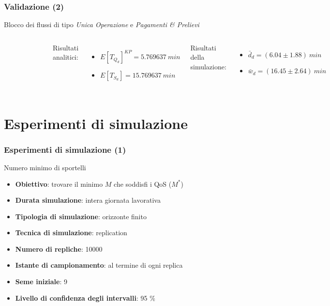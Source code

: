 \documentclass[
	usepdftitle=false,
	xcolor={table, dvipsnames},
	hyperref={
		pdftitle={Studio delle prestazioni di un Ufficio Postale ispirato a Poste Italiane},
    	pdfauthor={A. Chillotti, C. Cuffaro e S. Tiberi}
    }
]{beamer}
\newcommand{\uo}{\textsl{Unica Operazione}}
\newcommand{\pp}{\textsl{Pagamenti \& Prelievi}}
\begin{document}
\begin{frame}
\frametitle{Validazione (2)}
Blocco dei flussi di tipo \uo{} e \pp{}
\vspace{2em}
\begin{columns}[c]
\begin{figure}[ht]
\centering
\includegraphics[width=\textwidth]{validazione-modello-analitico-1b}
\end{figure}
Risultati analitici:
\begin{itemize}
\item $E[T_{Q_d}]^{KP} = 5.769637\ min$
\item $E[T_{S_d}] = 15.769637\ min$
\end{itemize}
Risultati della simulazione:
\begin{itemize}
\item $\bar{d}_d = (6.04 \pm 1.88)\ min$
\item $\bar{w}_d = (16.45 \pm 2.64)\ min$
\end{itemize}
\end{columns}
\end{frame}

\section{Esperimenti di simulazione}
\begin{frame}
\frametitle{Esperimenti di simulazione (1)}
\begin{block}{Numero minimo di sportelli}
\begin{itemize}
\item \textbf{Obiettivo}: trovare il minimo $M$ che soddisfi i QoS ($M^*$)
\item \textbf{Durata simulazione}: intera giornata lavorativa
\item \textbf{Tipologia di simulazione}: orizzonte finito
\item \textbf{Tecnica di simulazione}: replication
\item \textbf{Numero di repliche}: 10000
\item \textbf{Istante di campionamento}: al termine di ogni replica
\item \textbf{Seme iniziale}: 9
\item \textbf{Livello di confidenza degli intervalli}: 95 \%
\end{itemize}
\end{block}
\end{frame}
\end{document}
